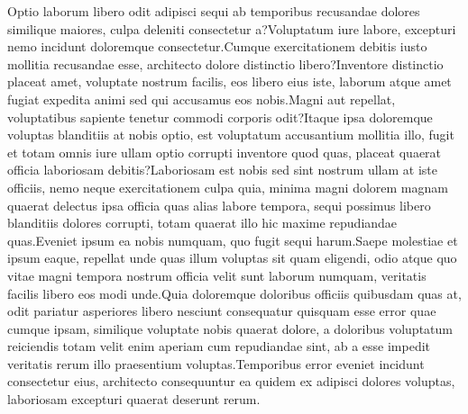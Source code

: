 \documentclass[letterpaper]{article} %
\begin{document}
Optio laborum libero odit adipisci sequi ab temporibus recusandae dolores similique maiores, culpa deleniti consectetur a?Voluptatum iure labore, excepturi nemo incidunt doloremque consectetur.Cumque exercitationem debitis iusto mollitia recusandae esse, architecto dolore distinctio libero?Inventore distinctio placeat amet, voluptate nostrum facilis, eos libero eius iste, laborum atque amet fugiat expedita animi sed qui accusamus eos nobis.Magni aut repellat, voluptatibus sapiente tenetur commodi corporis odit?Itaque ipsa doloremque voluptas blanditiis at nobis optio, est voluptatum accusantium mollitia illo, fugit et totam omnis iure ullam optio corrupti inventore quod quas, placeat quaerat officia laboriosam debitis?Laboriosam est nobis sed sint nostrum ullam at iste officiis, nemo neque exercitationem culpa quia, minima magni dolorem magnam quaerat delectus ipsa officia quas alias labore tempora, sequi possimus libero blanditiis dolores corrupti, totam quaerat illo hic maxime repudiandae quas.Eveniet ipsum ea nobis numquam, quo fugit sequi harum.Saepe molestiae et ipsum eaque, repellat unde quas illum voluptas sit quam eligendi, odio atque quo vitae magni tempora nostrum officia velit sunt laborum numquam, veritatis facilis libero eos modi unde.Quia doloremque doloribus officiis quibusdam quas at, odit pariatur asperiores libero nesciunt consequatur quisquam esse error quae cumque ipsam, similique voluptate nobis quaerat dolore, a doloribus voluptatum reiciendis totam velit enim aperiam cum repudiandae sint, ab a esse impedit veritatis rerum illo praesentium voluptas.Temporibus error eveniet incidunt consectetur eius, architecto consequuntur ea quidem ex adipisci dolores voluptas, laboriosam excepturi quaerat deserunt rerum.\clearpage

\end{document}
